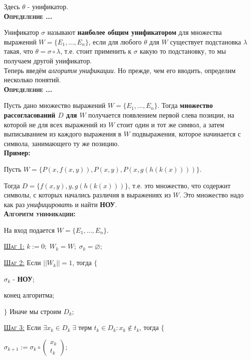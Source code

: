 \documentclass[18pt, a4paper]{extarticle}
\newcounter{par}
\newcounter{spar}
\newcounter{zap}
\newcommand{\opr}{\textbf{\textsc{Определение \thepar.\if\thespar1\thespar.\fi\thezap.\;}}\stepcounter{zap}}
\newcommand{\primer}{\textbf{Пример:\;}}
\newcommand{\sg}{\sigma}
\newcommand{\lot}[3]{#1_#2,\dots,#1_#3}
\begin{document}
Здесь $\theta$ - унификатор.\\ 

\opr 

Унификатор $\sg$ называют \textbf{наиболее общим унификатором} для множества выражений $W=\{\lot E 1 n\}$, если для любого $\theta$ для $W$ существует подстановка $\lambda$ такая, что $\theta=\sg\circ\lambda$, т.е. стоит применить к $\sg$ какую то подстановку, то мы получаем другой унификатор.\\

Теперь введём \textit{алгоритм унификации}. Но прежде, чем его вводить, определим несколько понятий.\\

\opr 

Пусть дано множество выражений $W=\{\lot E 1 n\}$. Тогда \textbf{множество рассогласований $D$ для $W$} получается появлением первой слева позиции, на которой не для всех выражений из $W$ стоит один и тот же символ, а затем выписыванием из каждого выражения в $W$ подвыражения, которое начинается с символа, занимающего ту же позицию.\\

\primer

Пусть $W=\{P(x,f(x,y)),P(x,y),P(x,g(h(k(x))))\}$.

Тогда $D=\{f(x,y),y,g(h(k(x)))\}$, т.е. это множество, что содержит символы, с которых начались различия в выражениях из $W$. Это множество надо как раз \textit{унифицировать} и найти \textbf{НОУ}.\\

\textbf{\textsc{Алгоритм унификации:}}

На вход подается $W=\{\lot E 1 n\}$.

\textsc{\underline{Шаг 1:}} $k:=0;\;W_k=W;\;\sg_k=\varnothing$;

\textsc{\underline{Шаг 2:}} Если $||W_k||=1$, тогда $\{$

\qquad\qquad\qquad $\sg_k$ - \textbf{НОУ}; 

\qquad\qquad\qquad конец алгоритма; 

\qquad\qquad $\}$ Иначе мы строим $D_k$;

\textsc{\underline{Шаг 3:}} Если $\exists x_k\in D_k\;\exists$ терм $t_k\in D_k\!:x_k\notin t_k$, тогда $\{$

\qquad\qquad\qquad $\sg_{k+1}:=\sg_k\circ\begin{pmatrix}x_k\\t_k\end{pmatrix}$;
\end{document}
